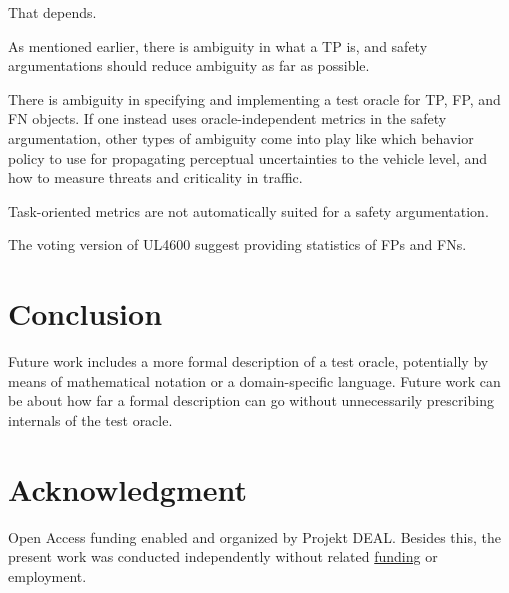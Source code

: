 \documentclass[conference]{IEEEtran}
\begin{document}
That depends.

As mentioned earlier, there is ambiguity in what a TP is, and safety argumentations should reduce ambiguity as far as possible.


There is ambiguity in specifying and implementing a test oracle for TP, FP, and FN objects. 
If one instead uses oracle-independent metrics in the safety argumentation, other types of ambiguity come into play like which behavior policy to use for propagating perceptual uncertainties to the vehicle level, and how to measure threats and criticality in traffic. 

Task-oriented metrics are not automatically suited for a safety argumentation.

The voting version of UL4600 \cite[Sec. 8.4.1.2]{UL4600_voting_2019} suggest providing statistics of FPs and FNs. 



\section{Conclusion}
\label{sec:conclusion}




Future work includes a more formal description of a test oracle, potentially by means of mathematical notation or a domain-specific language.
Future work can be about how far a formal description can go without unnecessarily prescribing internals of the test oracle. 


\section*{Acknowledgment}
\label{sec:acknowledgment}

Open Access funding enabled and organized by Projekt DEAL. %
Besides this, the present work was conducted independently without related \href{https://ko-fi.com/michaelhoss}{funding} or employment. 

%
% 
% 
% 
% 
% 


{\small


}
\end{document}
